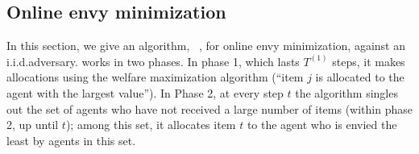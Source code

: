 


\subsection{Online envy minimization}\label{subsec: iid envy n agents}

In this section, we give an algorithm,    ~, for online envy minimization, against an i.i.d.\@ adversary.  works in two phases. In phase 1, which lasts $T^{(1)}$ steps, it makes allocations using the welfare maximization algorithm (``item $j$ is allocated to the agent with the largest value''). In Phase 2, at every step $t$ the algorithm singles out the set of agents who have not received a large number of items (within phase 2, up until $t$); among this set, it allocates item $t$ to the agent who is envied the least by agents in this set.


